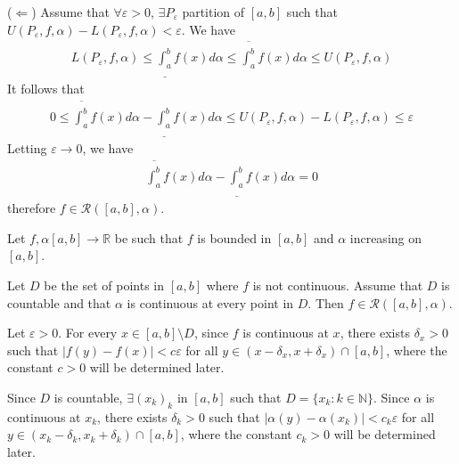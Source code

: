 \documentclass{tufte-handout}
\begin{document}
\noindent (\(\Leftarrow\)) 
Assume that \(\forall \varepsilon>0\), 
\(\exists P_\varepsilon\) partition of \([a,b]\) 
such that \( U(P_\varepsilon, f, \alpha) - L(P_\varepsilon, f, \alpha) < \varepsilon \).
We have 
\begin{align}
    L(P_\varepsilon, f, \alpha) \leq \underline{\int_{a}^b} f(x)d\alpha
    \leq \overline{\int_{a}^b} f(x)d\alpha \leq U(P_\varepsilon, f, \alpha)
\end{align}
It follows that 
\begin{align}
    0 \leq \overline{\int_{a}^b} f(x)d\alpha - \underline{\int_{a}^b} f(x)d\alpha 
    \leq U(P_\varepsilon, f, \alpha) - L(P_\varepsilon, f, \alpha) \leq \varepsilon
\end{align}
Letting \( \varepsilon \to 0 \), we have
\begin{align}
    \overline{\int_{a}^b} f(x)d\alpha - \underline{\int_{a}^b} f(x)d\alpha = 0
\end{align}
therefore \( f \in \mathcal{R}([a,b], \alpha) \).
\hfill\qedsymbol
{}

\begin{Theorem}
    Let \( f, \alpha [a,b] \to \mathbb{R} \) 
    be such that \( f \) is bounded in \([a,b]\)
    and \( \alpha \) increasing on \([a,b]\).

    Let \( D \) be the set of points in \([a,b]\) where \( f \) is
    not continuous. Assume that \( D \) is countable
    and that \( \alpha \) is continuous at every point in \( D \).
    Then \( f \in \mathcal{R}([a,b], \alpha) \).
\end{Theorem}
Let \(\varepsilon>0\). For every \( x \in [a,b]\setminus D\), 
since \( f \) is continuous at \( x \), there exists 
\(\delta_x > 0 \) such that \( |f(y) - f(x)| < c\varepsilon \) for all \( y \in (x-\delta_x, x+\delta_x) \cap [a,b] \),
where the constant \(c>0\) will be determined later.

Since \( D \) is countable, \(\exists (x_k)_k \) in \([a,b]\) 
such that \(D = \{x_k:k\in \mathbb{N}\}\).
Since \( \alpha \) is continuous at \(x_k\), 
there exists \( \delta_k > 0 \) such that 
\( |\alpha(y) - \alpha(x_k)| < c_k\varepsilon \) 
for all \( y \in (x_k - \delta_k, x_k + \delta_k) 
\cap [a,b] \),
where the constant \( c_k > 0 \) will be determined later.
\end{document}
